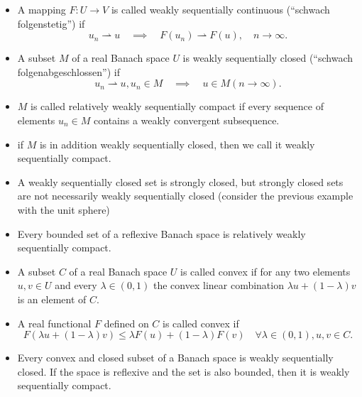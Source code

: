 \documentclass[../skript.tex]{subfiles}
\begin{document}
\begin{itemize}
\item A mapping $F : U \to V$ is called weakly sequentially continuous (``schwach folgenstetig'') if
\[
	u_n \rightharpoonup u \quad \implies \quad F(u_n) \rightharpoonup F(u), \quad n \to \infty.
\]
\item A subset $M$ of a real Banach space $U$ is weakly sequentially closed (``schwach folgenabgeschlossen'') if
\[
	u_n \rightharpoonup u, u_n \in M \quad \implies \quad u \in M (n \to \infty).
\]
\item $M$ is called relatively weakly sequentially compact if every sequence of elements $u_n \in M$ contains a weakly convergent subsequence.
\item if $M$ is in addition weakly sequentially closed, then we call it weakly sequentially compact.
\item A weakly sequentially closed set is strongly closed, but strongly closed sets are not necessarily weakly sequentially closed (consider the previous example with the unit sphere)
\item Every bounded set of a reflexive Banach space is relatively weakly sequentially compact.
\item A subset $C$ of a real Banach space $U$ is called convex if for any two elements $u, v \in U$ and every $\lambda \in (0, 1)$ the convex linear combination $\lambda u + (1-\lambda) v$ is an element of $C$.
\item A real functional $F$ defined on $C$ is called convex if
\[
	F(\lambda u + (1-\lambda)v) \leq \lambda F(u) + (1-\lambda) F(v) \quad \forall \lambda \in (0, 1), u, v \in C.
\]
\item Every convex and closed subset of a Banach space is weakly sequentially closed. If the space is reflexive and the set is also bounded, then it is weakly sequentially compact.
\end{itemize}
\end{document}
